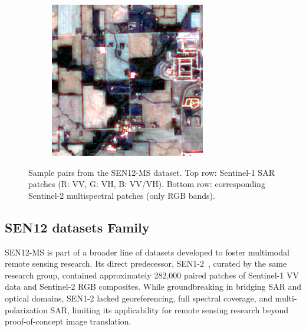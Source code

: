 \begin{figure}[h!]
\begin{subfigure}{0.18\textwidth}
    \end{subfigure}
    \begin{subfigure}{0.18\textwidth}
        \includegraphics[width=\linewidth]{img/ROIs1970_fall_s2_145_p100.png}
    \end{subfigure}

    \caption[Sample SAR–optical pairs from SEN12-MS]{Sample pairs from the SEN12-MS dataset. Top row: Sentinel-1 SAR patches (R: VV, G: VH, B: VV/VH). Bottom row: corresponding Sentinel-2 multispectral patches (only RGB bands).}
    \label{fig:sen12ms_pairs}
\end{figure}



\subsection{SEN12 datasets Family}
SEN12-MS is part of a broader line of datasets developed to foster multimodal remote sensing research. Its direct predecessor, SEN1-2~\cite{sen12_2018}, curated by the same research group, contained approximately 282,000 paired patches of Sentinel-1 VV data and Sentinel-2 RGB composites. While groundbreaking in bridging SAR and optical domains, SEN1-2 lacked georeferencing, full spectral coverage, and multi-polarization SAR, limiting its applicability for remote sensing research beyond proof-of-concept image translation.

